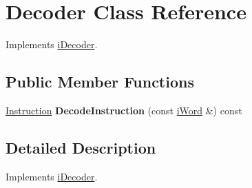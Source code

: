 \hypertarget{classDecoder}{
\section{Decoder Class Reference}
\label{classDecoder}
}


Implements \hyperlink{classiDecoder}{iDecoder}.  


\subsection*{Public Member Functions}
\begin{DoxyCompactItemize}
\item 
\hypertarget{classDecoder_a9f297296b2c7752b81f70acaeac1e732}{
\hyperlink{structInstruction}{Instruction} {\bfseries DecodeInstruction} (const \hyperlink{classiWord}{iWord} \&) const }
\label{classDecoder_a9f297296b2c7752b81f70acaeac1e732}

\end{DoxyCompactItemize}


\subsection{Detailed Description}
Implements \hyperlink{classiDecoder}{iDecoder}. 
